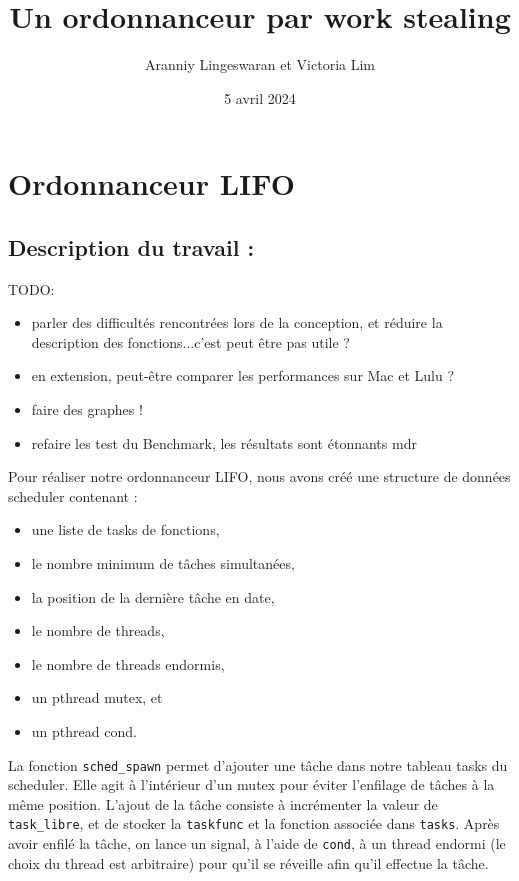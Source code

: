 \documentclass{article}
\title{\Large Un ordonnanceur par work stealing}
\author{Aranniy Lingeswaran et Victoria Lim}
\date{5 avril 2024}
\begin{document}
	
	\maketitle
	
	\section*{Ordonnanceur LIFO}
	
	\subsection*{Description du travail :}
	
		TODO:
		\begin{itemize}
		\item parler des difficultés rencontrées lors de la conception, et réduire la description des fonctions...c'est peut être pas utile ?
		\item en extension, peut-être comparer les performances sur Mac et Lulu ?
		\item faire des graphes !
		\item refaire les test du Benchmark, les résultats sont étonnants mdr
	\end{itemize}
	
	
	Pour réaliser notre ordonnanceur LIFO, nous avons créé une structure de données scheduler contenant :
	
	\begin{itemize}
		\item une liste de tasks de fonctions,
		\item le nombre minimum de tâches simultanées,
		\item la position de la dernière tâche en date,
		\item le nombre de threads,
		\item le nombre de threads endormis,
		\item un pthread mutex, et
		\item un pthread cond.
	\end{itemize}
	
	La fonction \texttt{sched\_spawn} permet d’ajouter une tâche dans notre tableau tasks du scheduler. Elle agit à l’intérieur d’un mutex pour éviter l’enfilage de tâches à la même position. L’ajout de la tâche consiste à incrémenter la valeur de \texttt{task\_libre}, et de stocker la \texttt{taskfunc} et la fonction associée dans \texttt{tasks}. Après avoir enfilé la tâche, on lance un signal, à l’aide de \texttt{cond}, à un thread endormi (le choix du thread est arbitraire) pour qu’il se réveille afin qu’il effectue la tâche.
	
\end{document}
